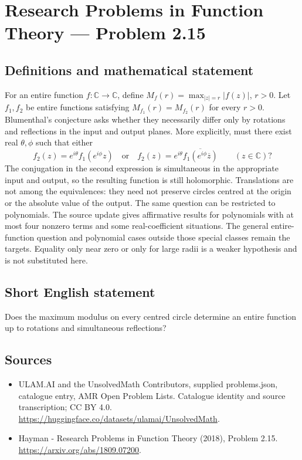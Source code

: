 \documentclass[11pt,a4paper]{article}
\begin{document}
\section*{Research Problems in Function Theory — Problem 2.15}\label{statement}

\subsection{Definitions and mathematical statement}
For an entire function $f:\mathbb C\to\mathbb C$, define
$M_f(r)=\max_{|z|=r}|f(z)|$, $r>0$. Let $f_1,f_2$ be entire functions satisfying $M_{f_1}(r)=M_{f_2}(r)$ for every $r>0$.
Blumenthal's conjecture asks whether they necessarily differ only by rotations and reflections in the input and output planes. More explicitly, must there exist real $\theta,\phi$ such that either
\[
f_2(z)=e^{i\theta}f_1(e^{i\phi}z)
\quad\text{or}\quad
f_2(z)=e^{i\theta}\overline{f_1(e^{i\phi}\overline z)}
\qquad(z\in\mathbb C)?
\]
The conjugation in the second expression is simultaneous in the appropriate input and output, so the resulting function is still holomorphic. Translations are not among the equivalences: they need not preserve circles centred at the origin or the absolute value of the output.
The same question can be restricted to polynomials. The source update gives affirmative results for polynomials with at most four nonzero terms and some real-coefficient situations. The general entire-function question and polynomial cases outside those special classes remain the targets. Equality only near zero or only for large radii is a weaker hypothesis and is not substituted here.
\subsection{Short English statement}
Does the maximum modulus on every centred circle determine an entire function up to rotations and simultaneous reflections?
\subsection{Sources}
\begin{itemize}
\item[S1] ULAM.AI and the UnsolvedMath Contributors, supplied problems.json, catalogue entry, AMR Open Problem Lists. Catalogue identity and source transcription; CC BY 4.0.
\url{https://huggingface.co/datasets/ulamai/UnsolvedMath}.
\item[S2] Hayman - Research Problems in Function Theory (2018), Problem 2.15. 
\url{https://arxiv.org/abs/1809.07200}.
\end{itemize}
\end{document}

